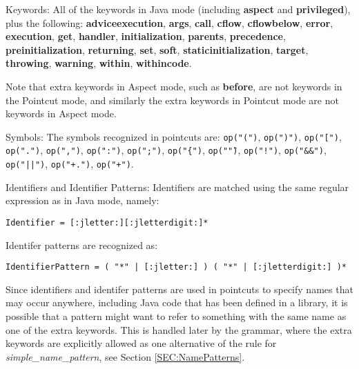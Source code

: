 \begin{description}
\item{Keywords:}
All of the keywords in {\sc Java} mode (including
{\bf aspect} and {\bf privileged}), plus the following:
{\bf adviceexecution}, {\bf args}, {\bf call}, {\bf cflow}, 
{\bf cflowbelow}, {\bf error}, {\bf execution}, {\bf get},
{\bf handler}, {\bf initialization}, {\bf parents}, {\bf precedence},
{\bf preinitialization}, {\bf returning}, {\bf set}, {\bf soft},
{\bf staticinitialization}, {\bf target}, {\bf throwing}, 
{\bf warning}, {\bf within}, {\bf withincode}.

Note that extra keywords in {\sc Aspect} mode,  such as {\bf before}, are
not keywords in the {\sc Pointcut} mode, and similarly the extra keywords
in {\sc Pointcut} mode are not keywords in {\sc Aspect} mode.    

\item{Symbols:}
The symbols recognized in pointcuts are: 
{\tt op("(")}, {\tt op(")")}, {\tt op("[")}, {\tt op(".")},
{\tt op(",")}, {\tt op(":")}, {\tt op(";")}, {\tt op("\{")},
{\tt op("\"")}, {\tt op("!")}, {\tt op("\&\&")}, {\tt op("||")},
{\tt op("+.")}, {\tt op("+")}. 

\item{Identifiers and Identifier Patterns:}  Identifiers are matched
using the same regular expression as in {\sc Java} mode, namely:

{\tt Identifier = [:jletter:][:jletterdigit:]*}

\noindent
Identifer patterns are recognized as:

{\tt IdentifierPattern = ( "*" | [:jletter:] ) ( "*" | [:jletterdigit:] )*}

Since identifiers and identifer patterns are used in pointcuts to
specify names that may occur anywhere, including Java code that has
been defined in a library,  it is possible that a pattern might want
to refer to something with the same name as one of the extra keywords.
This is handled later by the grammar,  where the extra keywords are
explicitly allowed as one alternative of the rule for 
{\em simple\_name\_pattern},  see Section \ref{SEC:NamePatterns}.
\end{description}


